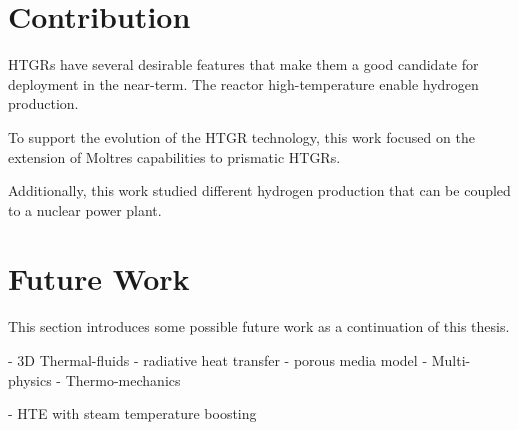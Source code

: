 \section{Contribution}

HTGRs have several desirable features that make them a good candidate for deployment in the near-term.
The reactor high-temperature enable hydrogen production.

To support the evolution of the HTGR technology, this work focused on the extension of Moltres capabilities to prismatic HTGRs.

Additionally, this work studied different hydrogen production that can be coupled to a nuclear power plant.

\section{Future Work}

This section introduces some possible future work as a continuation of this thesis.

- 3D Thermal-fluids
	- radiative heat transfer
	- porous media model
- Multi-physics
- Thermo-mechanics

- HTE with steam temperature boosting
